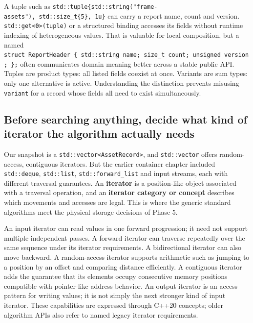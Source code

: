 A tuple such as \texttt{std::tuple\{std::string("frame-assets"),\ std::size\_t\{5\},\ 1u\}} can carry a report name, count and version. \texttt{std::get\textless{}0\textgreater{}(tuple)} or a structured binding accesses its fields without runtime indexing of heterogeneous values. That is valuable for local composition, but a named \texttt{struct\ ReportHeader\ \{\ std::string\ name;\ size\_t\ count;\ unsigned\ version;\ \};} often communicates domain meaning better across a stable public API. Tuples are product types: all listed fields coexist at once. Variants are sum types: only one alternative is active. Understanding the distinction prevents misusing \texttt{variant} for a record whose fields all need to exist simultaneously.

\subsection{Before searching anything, decide what kind of iterator the algorithm actually needs}\label{05-engine-i-ch006-before-searching-anything-decide-what-kind-of-iterator-the-algorithm-actually-needs}

Our snapshot is a \texttt{std::vector\textless{}AssetRecord\textgreater{}}, and \texttt{std::vector} offers random-access, contiguous iterators. But the earlier container chapter included \texttt{std::deque}, \texttt{std::list}, \texttt{std::forward\_list} and input streams, each with different traversal guarantees. An \textbf{iterator} is a position-like object associated with a traversal operation, and an \textbf{iterator category or concept} describes which movements and accesses are legal. This is where the generic standard algorithms meet the physical storage decisions of Phase 5.

An input iterator can read values in one forward progression; it need not support multiple independent passes. A forward iterator can traverse repeatedly over the same sequence under its iterator requirements. A bidirectional iterator can also move backward. A random-access iterator supports arithmetic such as jumping to a position by an offset and comparing distance efficiently. A contiguous iterator adds the guarantee that its elements occupy consecutive memory positions compatible with pointer-like address behavior. An output iterator is an access pattern for writing values; it is not simply the next stronger kind of input iterator. These capabilities are expressed through C++20 concepts; older algorithm APIs also refer to named legacy iterator requirements.

